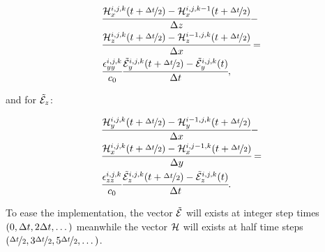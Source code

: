 \begin{eqnarray}
    &\cfrac{\mathcal{H}_x^{i, j, k}(t+\nicefrac{\Delta t}{2})-\mathcal{H}_x^{i, j, k-1}(t+\nicefrac{\Delta t}{2})}{\Delta z} - \nonumber \\
    &\cfrac{\mathcal{H}_z^{i, j, k}(t+\nicefrac{\Delta t}{2})-\mathcal{H}_z^{i-1, j, k}(t+\nicefrac{\Delta t}{2})}{\Delta x} = \nonumber\\
    &\cfrac{\epsilon_{yy}^{i,j,k}}{c_0}\cfrac{\tilde{\mathcal{E}}_y^{i,j,k}(t+\nicefrac{\Delta t}{2})-\tilde{\mathcal{E}}_y^{i,j,k}(t)}{\Delta t},
    \label{eq:fd_ey}
\end{eqnarray}

and for $\tilde{\mathcal{E}}_z$:

\begin{eqnarray}
    &\cfrac{\mathcal{H}_y^{i, j, k}(t+\nicefrac{\Delta t}{2})-\mathcal{H}_y^{i-1, j, k}(t+\nicefrac{\Delta t}{2})}{\Delta x} - \nonumber \\ 
    & \cfrac{\mathcal{H}_x^{i, j, k}(t+\nicefrac{\Delta t}{2})-\mathcal{H}_x^{i, j-1, k}(t+\nicefrac{\Delta t}{2})}{\Delta y} = \nonumber\\
    &\cfrac{\epsilon_{zz}^{i,j,k}}{c_0}\cfrac{\tilde{\mathcal{E}}_z^{i,j,k}(t+\nicefrac{\Delta t}{2})-\tilde{\mathcal{E}}_z^{i,j,k}(t)}{\Delta t}.
    \label{eq:fd_ez}
\end{eqnarray}


To ease the implementation, the vector $\tilde{\mathcal{E}}$ will exists at integer step times $(0, \Delta t, 2\Delta t, \dots)$ meanwhile the vector $\mathcal{H}$ will exists at half time steps $(\nicefrac{\Delta t}{2}, 3\nicefrac{\Delta t}{2}, 5\nicefrac{\Delta t}{2}, \dots)$.